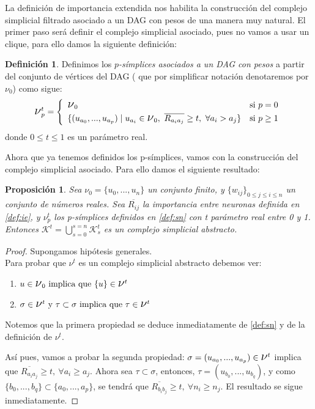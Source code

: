 \documentclass[12pt, a4paper, twoside]{book}
\numberwithin{equation}{section}
\theoremstyle{definition}
\newtheorem{defi}{Definición}
\theoremstyle{remark}
\theoremstyle{plain}
\newtheorem{prop}{Proposición}
\begin{document}
	La definición de importancia extendida nos habilita la construcción 
	del complejo simplicial filtrado asociado a un DAG con pesos de una 
	manera muy natural. El primer paso será definir el complejo 
	simplicial asociado, pues no vamos a usar un clique, para ello damos 
	la siguiente definición: 
	\begin{defi}
		Definimos los \textit{$p$-símplices asociados a un DAG 
		con pesos} a partir del conjunto de vértices del DAG ( que
		por simplificar notación denotaremos por {\Large $\nu$}$_{0}$) 
		como sigue:
	\begin{equation}
		\text{{\Large $\nu$}}_{p}^{t}=
		\left \{
			\begin{array}{ll}
				\text{{\Large $\nu$}}_{0} & \text{si } p=0\\[3pt]
				\{(u_{a_{0}},...,u_{a_{p}}) \mid u_{a_{i}} \in 
					\text{{\Large $\nu$}}_{0},\ 
					\overline{R_{a_{i}a_{j}}} \geq t,\ 
				\forall a_{i} > a_{j} \} & \text{si } p \geq 1
			\end{array}
		\right.  
		\label{def:sn}
	\end{equation}
	donde $0 \leq t \leq 1$ es un parámetro real.
	\end{defi}
	Ahora que ya tenemos definidos los p-símplices, vamos con la 
	construcción del complejo simplicial asociado. Para ello damos el 
	siguiente resultado:
	\begin{prop}
		Sea {\Large $\nu$}$_{0}=\{u_{0},...,u_{n}\}$ un conjunto 
		finito, y $\{w_{ij}\}_{0\leq j \leq i \leq n}$ un 
		conjunto de números reales. Sea $\overline{R_{ij}}$ la 
		importancia entre neuronas definida en \ref{def:ie}, y 
		{\Large $\nu$}$_{p}^{t}$ los p-símplices definidos en 
		\ref{def:sn} con t parámetro real entre 0 y 1. Entonces 
		$\mathcal{K}^{t}=\bigcup_{s=0}^{s=n}\mathcal{K}_{s}^{t}$ es un 
		complejo simplicial abstracto. 
		\label{prop:cs}
	\end{prop}

	\begin{proof}
		Supongamos hipótesis generales. \\
		Para probar que {\Large $\nu$}$^{t}$ es un complejo simplicial 
		abstracto debemos ver: 
		\begin{enumerate}
			\item $u \in \text{{\Large $\nu$}}_{0} \text{ implica 
				que } \{u\} \in \text{{\Large $\nu$}}^{t}$
			\item $ \sigma \in \text{{\Large $\nu$}}^{t} 
				\text{ y } \tau \subset \sigma \text{ implica 
				que } \tau \in \text{{\Large $\nu$}}^{t}$	
		\end{enumerate}
		Notemos que la primera propiedad se deduce inmediatamente de 
		\ref{def:sn} y de la definición de {\Large $\nu$}$^{t}$.

		Así pues, vamos a probar la segunda propiedad:
		$\sigma=(u_{a_{0}},...,u_{a_{p}}) \in 
		\text{{\Large $\nu$}}^{t}$ 
		 implica que $\overline{R_{a_{i}a_{j}}}\geq t, \  
		\forall a_{i} \geq a_{j}$. 
		Ahora sea $\tau \subset \sigma$, entonces, 
		$\tau = (u_{b_{0}},...,u_{b_{q}})$, y como $\{b_{0},...,
		b_{q}\} 
		\subset \{a_{0},...,a_{p}\}$, se tendrá que 
		$\overline{R_{b_{i}b_{j}}} \geq t,\ \forall n_{i} \geq n_{j}$. 
		El resultado se sigue inmediatamente. 
	\end{proof}
\end{document}
